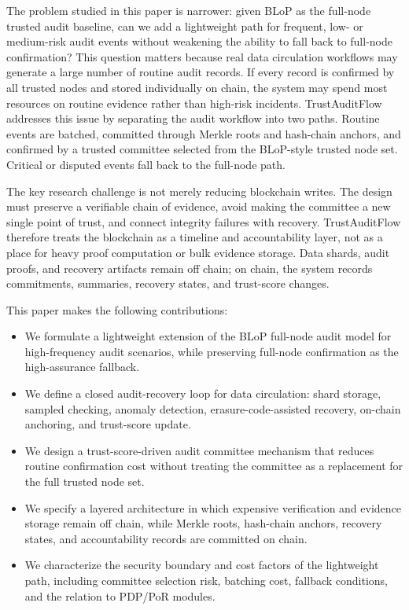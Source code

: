 The problem studied in this paper is narrower: given BLoP as the full-node trusted audit baseline, can we add a lightweight path for frequent, low- or medium-risk audit events without weakening the ability to fall back to full-node confirmation? This question matters because real data circulation workflows may generate a large number of routine audit records. If every record is confirmed by all trusted nodes and stored individually on chain, the system may spend most resources on routine evidence rather than high-risk incidents. TrustAuditFlow addresses this issue by separating the audit workflow into two paths. Routine events are batched, committed through Merkle roots and hash-chain anchors, and confirmed by a trusted committee selected from the BLoP-style trusted node set. Critical or disputed events fall back to the full-node path.

The key research challenge is not merely reducing blockchain writes. The design must preserve a verifiable chain of evidence, avoid making the committee a new single point of trust, and connect integrity failures with recovery. TrustAuditFlow therefore treats the blockchain as a timeline and accountability layer, not as a place for heavy proof computation or bulk evidence storage. Data shards, audit proofs, and recovery artifacts remain off chain; on chain, the system records commitments, summaries, recovery states, and trust-score changes.

This paper makes the following contributions:

\begin{itemize}
  \item We formulate a lightweight extension of the BLoP full-node audit model for high-frequency audit scenarios, while preserving full-node confirmation as the high-assurance fallback.
  \item We define a closed audit-recovery loop for data circulation: shard storage, sampled checking, anomaly detection, erasure-code-assisted recovery, on-chain anchoring, and trust-score update.
  \item We design a trust-score-driven audit committee mechanism that reduces routine confirmation cost without treating the committee as a replacement for the full trusted node set.
  \item We specify a layered architecture in which expensive verification and evidence storage remain off chain, while Merkle roots, hash-chain anchors, recovery states, and accountability records are committed on chain.
  \item We characterize the security boundary and cost factors of the lightweight path, including committee selection risk, batching cost, fallback conditions, and the relation to PDP/PoR modules.
\end{itemize}
